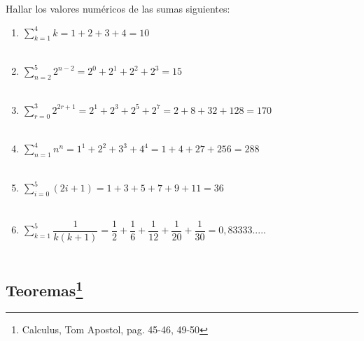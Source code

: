 \begin{ej}
Hallar los valores numéricos de las sumas siguientes:
\begin{enumerate}[\bfseries a)]
\item $\displaystyle\sum_{k=1}^{4} k = 1 + 2 + 3 + 4 = 10$\\\\

\item $\displaystyle\sum_{n=2}^{5} 2^{n-2} = 2^{0} + 2^{1} + 2^{2} + 2^{3} = 15$\\\\

\item $\displaystyle\sum_{r=0}^{3} 2^{2r+1} = 2^{1} + 2^{3} +  2^{5} + 2^{7} = 2 + 8 + 32 + 128 = 170$ \\\\

\item $\displaystyle\sum_{n=1}^{4} n^n = 1^1 + 2^2 + 3^3 + 4^4 = 1 + 4 + 27 + 256= 288$ \\\\

\item $\displaystyle\sum_{i=0}^{5} (2i + 1) = 1 + 3 + 5 + 7 + 9 + 11 = 36$ \\\\

\item $\displaystyle\sum_{k=1}^{5} \dfrac{1}{k(k+1)} = \dfrac{1}{2} + \dfrac{1}{6} + \dfrac{1}{12} + \dfrac{1}{20} + \dfrac{1}{30} = 0,83333.....$ \\\\
\end{enumerate}
\end{ej}






\subsection[Teoremas]{Teoremas\footnote{Calculus, Tom Apostol, pag. 45-46, 49-50}}

